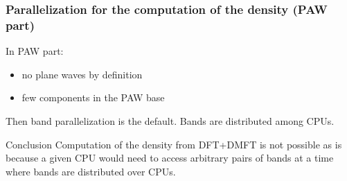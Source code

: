 \begin{frame}
  \frametitle{Parallelization for the computation of the density (PAW part)}
  In PAW part:
  \begin{itemize}
    \item no plane waves by definition
    \item few components in the PAW base
  \end{itemize}
  Then band parallelization is the default. Bands are distributed among CPUs.
\end{frame}

\begin{frame}
  \begin{block}{Conclusion}
    Computation of the density from DFT+DMFT is not possible as is because a given
    CPU would need to access arbitrary pairs of bands at a time where bands are
    distributed over CPUs.
  \end{block}
\end{frame}
